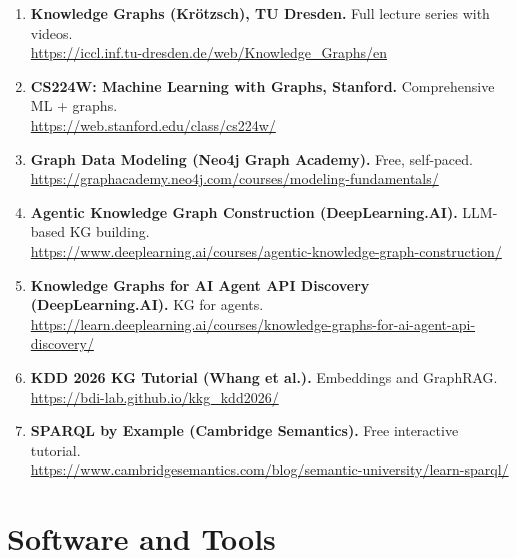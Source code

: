 \documentclass[11pt,a4paper,oneside,openany]{book}
\theoremstyle{definition}
\theoremstyle{plain}
\theoremstyle{remark}
\begin{document}
\begin{enumerate}
	\item \textbf{Knowledge Graphs (Krötzsch), TU Dresden.} Full lecture series with videos.\\
	      \url{https://iccl.inf.tu-dresden.de/web/Knowledge_Graphs/en}
	\item \textbf{CS224W: Machine Learning with Graphs, Stanford.} Comprehensive ML + graphs.\\
	      \url{https://web.stanford.edu/class/cs224w/}
	\item \textbf{Graph Data Modeling (Neo4j Graph Academy).} Free, self-paced.\\
	      \url{https://graphacademy.neo4j.com/courses/modeling-fundamentals/}
	\item \textbf{Agentic Knowledge Graph Construction (DeepLearning.AI).} LLM-based KG building.\\
	      \url{https://www.deeplearning.ai/courses/agentic-knowledge-graph-construction/}
	\item \textbf{Knowledge Graphs for AI Agent API Discovery (DeepLearning.AI).} KG for agents.\\
	      \url{https://learn.deeplearning.ai/courses/knowledge-graphs-for-ai-agent-api-discovery/}
	\item \textbf{KDD 2026 KG Tutorial (Whang et al.).} Embeddings and GraphRAG.\\
	      \url{https://bdi-lab.github.io/kkg_kdd2026/}
	\item \textbf{SPARQL by Example (Cambridge Semantics).} Free interactive tutorial.\\
	      \url{https://www.cambridgesemantics.com/blog/semantic-university/learn-sparql/}
\end{enumerate}

\section{Software and Tools}\label{sec:res-software}
\end{document}
